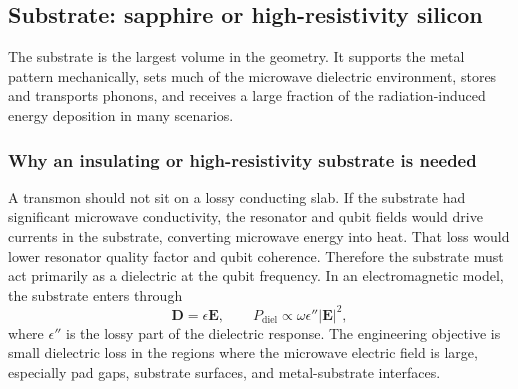 \documentclass[11pt]{article}
\begin{document}
\subsection{Substrate: sapphire or high-resistivity silicon}
The substrate is the largest volume in the geometry. It supports the metal pattern mechanically, sets much of the microwave dielectric environment, stores and transports phonons, and receives a large fraction of the radiation-induced energy deposition in many scenarios.

\subsubsection{Why an insulating or high-resistivity substrate is needed}
A transmon should not sit on a lossy conducting slab. If the substrate had significant microwave conductivity, the resonator and qubit fields would drive currents in the substrate, converting microwave energy into heat. That loss would lower resonator quality factor and qubit coherence. Therefore the substrate must act primarily as a dielectric at the qubit frequency. In an electromagnetic model, the substrate enters through
\begin{equation}
    \mathbf{D}=\epsilon \mathbf{E},
    \qquad
    P_{\mathrm{diel}} \propto \omega \epsilon'' |\mathbf{E}|^2,
\end{equation}
where $\epsilon''$ is the lossy part of the dielectric response. The engineering objective is small dielectric loss in the regions where the microwave electric field is large, especially pad gaps, substrate surfaces, and metal-substrate interfaces.
\end{document}
